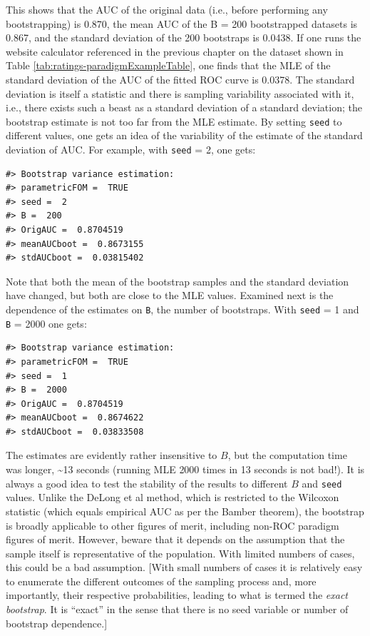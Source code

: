 \documentclass[
]{book}
\begin{document}
This shows that the AUC of the original data (i.e., before performing any bootstrapping) is 0.870, the mean AUC of the B = 200 bootstrapped datasets is 0.867, and the standard deviation of the 200 bootstraps is 0.0438. If one runs the website calculator referenced in the previous chapter on the dataset shown in Table \ref{tab:ratings-paradigmExampleTable}, one finds that the MLE of the standard deviation of the AUC of the fitted ROC curve is 0.0378. The standard deviation is itself a statistic and there is sampling variability associated with it, i.e., there exists such a beast as a standard deviation of a standard deviation; the bootstrap estimate is not too far from the MLE estimate. By setting \texttt{seed} to different values, one gets an idea of the variability of the estimate of the standard deviation of AUC. For example, with \texttt{seed} = 2, one gets:

\begin{verbatim}
#> Bootstrap variance estimation: 
#> parametricFOM =  TRUE 
#> seed =  2 
#> B =  200 
#> OrigAUC =  0.8704519 
#> meanAUCboot =  0.8673155 
#> stdAUCboot =  0.03815402
\end{verbatim}

Note that both the mean of the bootstrap samples and the standard deviation have changed, but both are close to the MLE values. Examined next is the dependence of the estimates on \texttt{B}, the number of bootstraps. With \texttt{seed} = 1 and \texttt{B} = 2000 one gets:

\begin{verbatim}
#> Bootstrap variance estimation: 
#> parametricFOM =  TRUE 
#> seed =  1 
#> B =  2000 
#> OrigAUC =  0.8704519 
#> meanAUCboot =  0.8674622 
#> stdAUCboot =  0.03833508
\end{verbatim}

The estimates are evidently rather insensitive to \(B\), but the computation time was longer, \textasciitilde13 seconds (running MLE 2000 times in 13 seconds is not bad!). It is always a good idea to test the stability of the results to different \(B\) and \texttt{seed} values. Unlike the DeLong et al method, which is restricted to the Wilcoxon statistic (which equals empirical AUC as per the Bamber theorem), the bootstrap is broadly applicable to other figures of merit, including non-ROC paradigm figures of merit. However, beware that it depends on the assumption that the sample itself is representative of the population. With limited numbers of cases, this could be a bad assumption. {[}With small numbers of cases it is relatively easy to enumerate the different outcomes of the sampling process and, more importantly, their respective probabilities, leading to what is termed the \emph{exact bootstrap}. It is ``exact'' in the sense that there is no seed variable or number of bootstrap dependence.{]}
\end{document}

